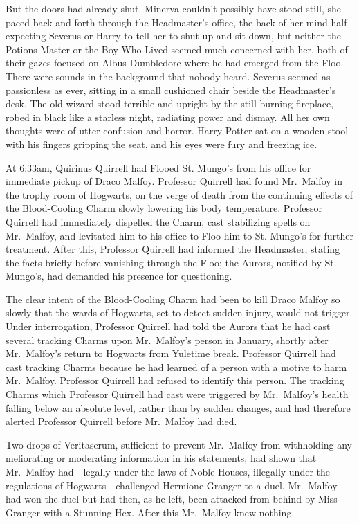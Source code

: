 But the doors had already shut.
\sbreak
Minerva couldn't possibly have stood still, she paced back and forth through 
the Headmaster's office, the back of her mind half-expecting Severus or Harry 
to tell her to shut up and sit down, but neither the Potions Master or the 
Boy-Who-Lived seemed much concerned with her, both of their gazes focused on 
Albus Dumbledore where he had emerged from the Floo. There were sounds in the 
background that nobody heard. Severus seemed as passionless as ever, sitting in 
a small cushioned chair beside the Headmaster's desk. The old wizard stood 
terrible and upright by the still-burning fireplace, robed in black like a 
starless night, radiating power and dismay. All her own thoughts were of utter 
confusion and horror. Harry Potter sat on a wooden stool with his fingers 
gripping the seat, and his eyes were fury and freezing ice.

At 6:33am, Quirinus Quirrell had Flooed St. Mungo's from his office for 
immediate pickup of Draco Malfoy. Professor Quirrell had found Mr.~Malfoy in 
the trophy room of Hogwarts, on the verge of death from the continuing effects 
of the Blood-Cooling Charm slowly lowering his body temperature. Professor 
Quirrell had immediately dispelled the Charm, cast stabilizing spells on 
Mr.~Malfoy, and levitated him to his office to Floo him to St. Mungo's for 
further treatment. After this, Professor Quirrell had informed the Headmaster, 
stating the facts briefly before vanishing through the Floo; the Aurors, 
notified by St. Mungo's, had demanded his presence for questioning.

The clear intent of the Blood-Cooling Charm had been to kill Draco Malfoy so 
slowly that the wards of Hogwarts, set to detect sudden injury, would not 
trigger. Under interrogation, Professor Quirrell had told the Aurors that he 
had cast several tracking Charms upon Mr.~Malfoy's person in January, shortly 
after Mr.~Malfoy's return to Hogwarts from Yuletime break. Professor Quirrell 
had cast tracking Charms because he had learned of a person with a motive to 
harm Mr.~Malfoy. Professor Quirrell had refused to identify this person. The 
tracking Charms which Professor Quirrell had cast were triggered by 
Mr.~Malfoy's health falling below an absolute level, rather than by sudden 
changes, and had therefore alerted Professor Quirrell before Mr.~Malfoy had 
died.

Two drops of Veritaserum, sufficient to prevent Mr.~Malfoy from withholding any 
meliorating or moderating information in his statements, had shown that 
Mr.~Malfoy had---legally under the laws of Noble Houses, illegally under the 
regulations of Hogwarts---challenged Hermione Granger to a duel. Mr.~Malfoy had 
won the duel but had then, as he left, been attacked from behind by Miss 
Granger with a Stunning Hex. After this Mr.~Malfoy knew nothing.

